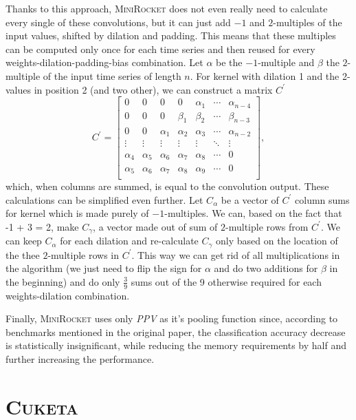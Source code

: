 \documentclass{article}
\newcommand\MINIROCKET{\textsc{MiniRocket}\xspace}
\newcommand\CUKETA{\textsc{Cuketa}\xspace}
\begin{document}
Thanks to this approach, \MINIROCKET does not even really need to calculate every single of these convolutions, but it can just add $-1$ and $2$-multiples of the input values, shifted by dilation and padding. This means that these multiples can be computed only once for each time series and then reused for every weights-dilation-padding-bias combination. Let $\alpha$ be the $-1$-multiple and $\beta$ the $2$-multiple of the input time series of length $n$. For kernel with dilation 1 and the 2-values in position 2 (and two other), we can construct a matrix $C^\prime$
$$
C^\prime = \left[\begin{array}{ccccccc}
    0        & 0        & 0        & 0        & \alpha_1 & \cdots & \alpha_{n-4} \\
    0        & 0        & 0        & \beta_1  & \beta_2  & \cdots & \beta_{n-3}  \\
    0        & 0        & \alpha_1 & \alpha_2 & \alpha_3 & \cdots & \alpha_{n-2} \\
    \vdots   & \vdots   & \vdots   & \vdots   & \vdots   & \ddots & \vdots       \\
    \alpha_4 & \alpha_5 & \alpha_6 & \alpha_7 & \alpha_8 & \cdots & 0            \\
    \alpha_5 & \alpha_6 & \alpha_7 & \alpha_8 & \alpha_9 & \cdots & 0            \\
\end{array}\right],
$$
which, when columns are summed, is equal to the convolution output. These calculations can be simplified even further. Let $C_\alpha$ be a vector of $C^\prime$ column sums for kernel which is made purely of $-1$-multiples. We can, based on the fact that -1 + 3 = 2, make $C_\gamma$, a vector made out of sum of $2$-multiple rows from $C^\prime$. We can keep $C_\alpha$ for each dilation and re-calculate $C_\gamma$ only based on the location of the thee $2$-multiple rows in $C^\prime$. This way we can get rid of all multiplications in the algorithm (we just need to flip the sign for $\alpha$ and do two additions for $\beta$ in the beginning) and do only $\frac{3}{9}$ sums out of the 9 otherwise required for each weights-dilation combination.

Finally, \MINIROCKET uses only \emph{PPV} as it's pooling function since, according to benchmarks \cite{minirocket} mentioned in the original paper, the classification accuracy decrease is statistically insignificant, while reducing the memory requirements by half and further increasing the performance.

\section{\CUKETA~}
\end{document}
